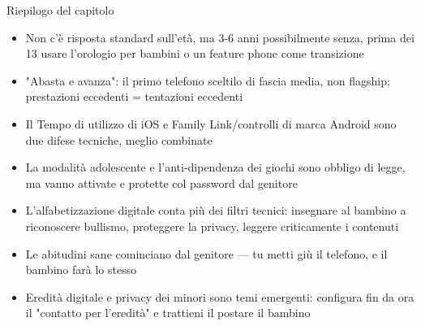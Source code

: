 \begin{tcbsummary}{Riepilogo del capitolo}
\begin{itemize}
  \item Non c'è risposta standard sull'età, ma 3-6 anni possibilmente senza, prima dei 13 usare l'orologio per bambini o un feature phone come transizione
  \item "Abasta e avanza": il primo telefono sceltilo di fascia media, non flagship; prestazioni eccedenti = tentazioni eccedenti
  \item Il Tempo di utilizzo di iOS e Family Link/controlli di marca Android sono due difese tecniche, meglio combinate
  \item La modalità adolescente e l'anti-dipendenza dei giochi sono obbligo di legge, ma vanno attivate e protette col password dal genitore
  \item L'alfabetizzazione digitale conta più dei filtri tecnici: insegnare al bambino a riconoscere bullismo, proteggere la privacy, leggere criticamente i contenuti
  \item Le abitudini sane cominciano dal genitore — tu metti giù il telefono, e il bambino farà lo stesso
  \item Eredità digitale e privacy dei minori sono temi emergenti: configura fin da ora il "contatto per l'eredità" e trattieni il postare il bambino
\end{itemize}

\end{tcbsummary}
